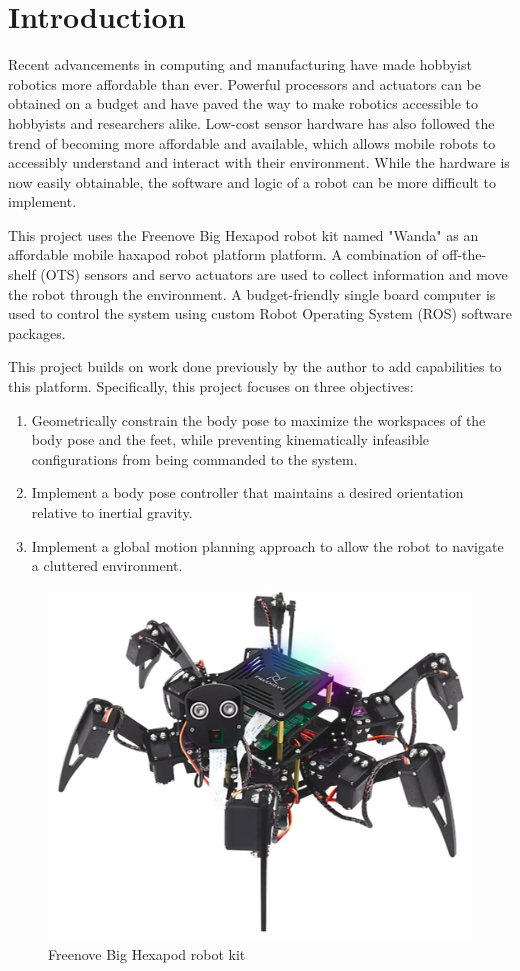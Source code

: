\section{Introduction}

Recent advancements in computing and manufacturing have made hobbyist robotics more affordable than ever. Powerful processors and actuators can be obtained on a budget and have paved the way to make robotics accessible to hobbyists and researchers alike. Low-cost sensor hardware has also followed the trend of becoming more affordable and available, which allows mobile robots to accessibly understand and interact with their environment. While the hardware is now easily obtainable, the software and logic of a robot can be more difficult to implement.

This project uses the Freenove Big Hexapod robot kit \cite{freenove} named "Wanda" as an affordable mobile haxapod robot platform platform. A combination of off-the-shelf (OTS) sensors and servo actuators are used to collect information and move the robot through the environment. A budget-friendly single board computer is used to control the system using custom Robot Operating System (ROS) \cite{rosnoetic} software packages.

This project builds on work done previously by the author to add capabilities to this platform. Specifically, this project focuses on three objectives:

\begin{enumerate}
    \item Geometrically constrain the body pose to maximize the workspaces of the body pose and the feet, while preventing kinematically infeasible configurations from being commanded to the system.
    \item Implement a body pose controller that maintains a desired orientation relative to inertial gravity.
    \item Implement a global motion planning approach to allow the robot to navigate a cluttered environment. 
\end{enumerate}

\begin{figure}
    \centerline{\includegraphics[scale=0.5]{02_introduction/figures/hexapod1.png}}
    \caption{Freenove Big Hexapod robot kit}
\end{figure}